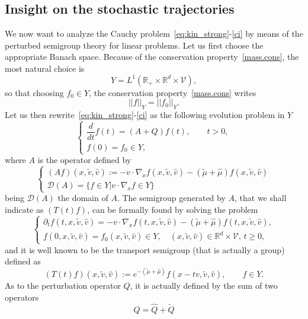 \documentclass[a4paper]{article}
\theoremstyle{Theorem}\newtheorem{proposition}{Proposition}[section]
\theoremstyle{Remark}\newtheorem{remark}{Remark}[section]
\theoremstyle{Theorem}\newtheorem{theorem}{Theorem}[section]
\newcommand{\R}{\mathbb{R}}
\newcommand{\hv}{\hat{v}}
\newcommand{\tv}{\tilde{v}}
\newcommand{\hmu}{\hat{\mu}}
\newcommand{\tmu}{\tilde{\mu}}
\begin{document}
\subsection{Insight on the stochastic trajectories}
We now want to analyze the Cauchy problem~\eqref{eq:kin_strong}-\eqref{ci} by means of the perturbed semigroup theory for linear problems. Let us first choose the appropriate Banach space. Because of the conservation property~\eqref{mass.cons}, the most natural choice is
\[
Y=L^1(\R_+\times \R^d\times \mathcal{V}),
\]
so that choosing $f_0 \in Y$, the conservation property~\eqref{mass.cons} writes
\[
||f||_Y=||f_0||_Y.
\]
Let us then rewrite~\eqref{eq:kin_strong}-\eqref{ci} as the following evolution problem in $Y$
\begin{equation}\label{probl.semi}
    \begin{cases}
        \dfrac{d}{dt}f(t) = (A+Q)f(t), \qquad t>0,\\[0.3cm]
        f(0)=f_0 \in Y,
    \end{cases}
\end{equation}
where $A$ is the operator defined by
\begin{equation}\label{def:A}
    \begin{cases}
        (Af)(x,\tv,\hv) := -v\cdot \nabla_x f(x,\tv,\hv)-(\tmu+\hmu)f(x,\tv,\hv)\\[0.3cm]
        \mathcal{D}(A) = \lbrace f \in Y | v\cdot\nabla_x f \in Y\rbrace
    \end{cases}
\end{equation}
being $\mathcal{D}(A)$ the domain of $A$. The semigroup generated by $A$, that we shall indicate as $(T(t)f)$, can be formally found by solving the problem 
\begin{equation*}
    \begin{cases}
        \partial_t f(t,x,\tv,\hv) = - v\cdot \nabla_x f(t,x,\tv,\hv) -(\tmu+\hmu) f(t,x,\tv,\hv), \\[0.3cm]
        f(0,x,\tv,\hv) = f_0(x,\tv,\hv) \in Y, \quad  (x,\tv,\hv) \in \R^d\times \mathcal{V}, \, t\ge 0,
    \end{cases}
\end{equation*}
and it is well known to be the transport semigroup (that is actually a group) defined as
\begin{equation*}
    (T(t)f)(x,\tv,\hv) := e^{-(\tmu+\hmu)} f(x-tv,\tv,\hv), \qquad f \in Y.
\end{equation*}
As to the perturbation operator $Q$, it is actually defined by the sum of two operators
\begin{equation}\label{def:Q}
Q=\hat{Q}+\tilde{Q}
\end{equation}
\end{document}
